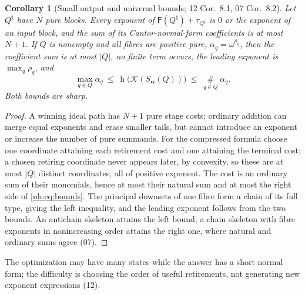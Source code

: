 \documentclass[11pt,a4paper]{article}
\newtheorem{corollary}[theorem]{Corollary}
\theoremstyle{definition}
\theoremstyle{remark}
\newcommand{\K}{\mathcal K}
\newcommand{\hgt}{\operatorname{h}}
\newcommand{\bigns}{\mathop{\#}\limits}
\newcommand{\Fdp}{\mathsf F}
\begin{document}
\begin{corollary}[Small output and universal bounds; 12 Cor.~8.1, 07 Cor.~8.2]
\label{nh:cor:smalloutput}
Let $Q^\sharp$ have $N$ pure blocks. Every exponent of
$\Fdp(Q^\sharp)+\tau_{Q^\sharp}$ is $0$ or the exponent of an input block, and
the sum of its Cantor-normal-form coefficients is at most $N+1$. If $Q$ is
nonempty and all fibres are positive pure, $\alpha_q=\omega^{\rho_q}$, then the
coefficient sum is at most $|Q|$, no finite term occurs, the leading exponent is
$\max_q\rho_q$, and
\begin{equation}\label{nh:eq:bounds}
 \max_{q\in Q}\alpha_q\ \le\ \hgt\bigl(\K(S_{\boldsymbol\alpha}(Q))\bigr)\ \le\
 \bigns_{q\in Q}\alpha_q .
\end{equation}
Both bounds are sharp.
\end{corollary}
\begin{proof}
A winning ideal path has $N+1$ pure stage costs; ordinary addition can merge
equal exponents and erase smaller tails, but cannot introduce an exponent or
increase the number of pure summands. For the compressed formula choose one
coordinate attaining each retirement cost and one attaining the terminal cost;
a chosen retiring coordinate never appears later, by convexity, so these are at
most $|Q|$ distinct coordinates, all of positive exponent. The cost is an
ordinary sum of their monomials, hence at most their natural sum and at most the
right side of \eqref{nh:eq:bounds}. The principal downsets of one fibre form a
chain of its full type, giving the left inequality, and the leading exponent
follows from the two bounds. An antichain skeleton attains the left bound; a
chain skeleton with fibre exponents in nonincreasing order attains the right
one, where natural and ordinary sums agree (07).
\end{proof}

The optimization may have many states while the answer has a short normal form;
the difficulty is choosing the order of useful retirements, not generating new
exponent expressions (12).
\end{document}
